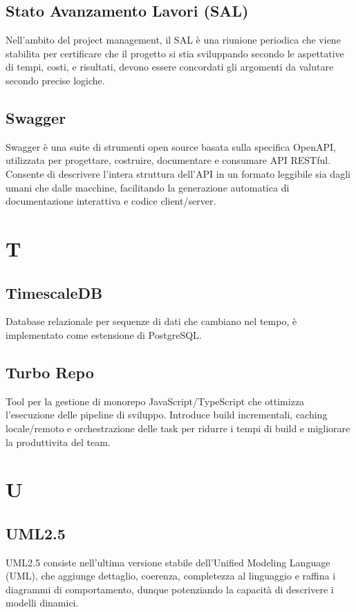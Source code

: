 \documentclass[10pt, letterpaper]{article}
\begin{document}
\subsection*{Stato Avanzamento Lavori (SAL)}
Nell'ambito del project management, il SAL è una riunione periodica che viene stabilita per certificare che il progetto si stia sviluppando secondo le
aspettative di tempi, costi, e risultati, devono essere concordati gli argomenti da valutare secondo precise logiche.

\subsection*{Swagger}
Swagger è una suite di strumenti open source basata sulla specifica OpenAPI, utilizzata per progettare, costruire, documentare e consumare API RESTful. 
Consente di descrivere l'intera struttura dell'API in un formato leggibile sia dagli umani che dalle macchine, facilitando la generazione automatica di documentazione
interattiva e codice client/server. 

\section{T}

\subsection*{TimescaleDB}
Database relazionale per sequenze di dati che cambiano nel tempo, è implementato come estensione di PostgreSQL.

\subsection*{Turbo Repo}
Tool per la gestione di monorepo JavaScript/TypeScript che ottimizza l'esecuzione delle pipeline di sviluppo. Introduce build incrementali, caching locale/remoto e orchestrazione delle task per ridurre i tempi di build e migliorare la produttivita del team.

\section{U}

\subsection*{UML2.5}
UML2.5 consiste nell'ultima versione stabile dell'Unified Modeling Language (UML), che aggiunge dettaglio, coerenza, completezza al linguaggio e raffina i
diagrammi di comportamento, dunque potenziando la capacità di descrivere i modelli dinamici.
\end{document}
